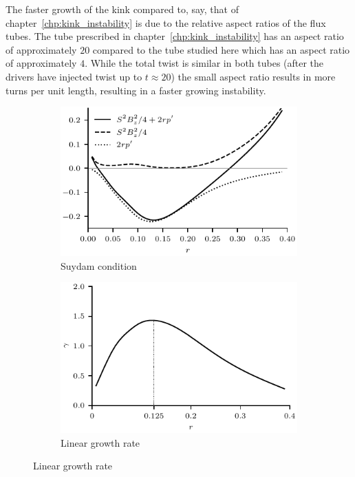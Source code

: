 The faster growth of the kink compared to, say, that of chapter~\ref{chp:kink_instability} is due to the relative aspect ratios of the flux tubes. The tube prescribed in chapter~\ref{chp:kink_instability} has an aspect ratio of approximately $20$ compared to the tube studied here which has an aspect ratio of approximately $4$. While the total twist is similar in both tubes (after the drivers have injected twist up to $t\approx20$) the small aspect ratio results in more turns per unit length, resulting in a faster growing instability.

\begin{figure}[t]
  \centering
    \begin{subfigure}{0.49\textwidth}
      \includegraphics[width=\linewidth]{suydam_condition_4.pdf}
      \caption{Suydam condition}
      \label{fig:suydam_condition_4}
    \end{subfigure}
    \hfill
    \begin{subfigure}{0.49\textwidth}
      \includegraphics[width=\linewidth]{growth_rate_4.pdf}
      \caption{Linear growth rate}
      \label{fig:growth_rate_4}
    \end{subfigure}
\label{fig:stability_and_growth}%
\end{figure}

